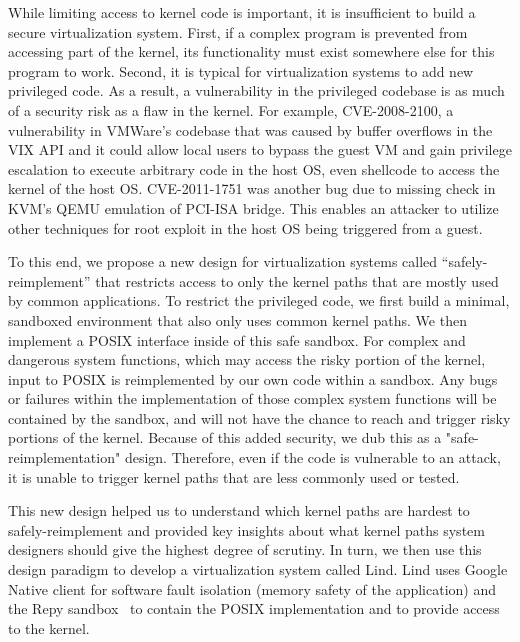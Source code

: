 While limiting access to kernel code is important, it is
insufficient to build a secure virtualization system.  First, if a complex
program is prevented from accessing part of the kernel, its functionality
must exist somewhere else for this program to work.  Second, it is
typical for virtualization systems to add new privileged code.
As a result, a vulnerability in the privileged codebase is as much of a security
risk as a flaw in the kernel.  %
For example, CVE-2008-2100, a vulnerability in VMWare's codebase that was caused by buffer overflows
in the VIX API and it could allow local users to bypass the guest VM and gain privilege escalation to execute arbitrary code
in the host OS, even shellcode to access the kernel of the host OS. CVE-2011-1751 was another bug due to
missing check in KVM's QEMU emulation of PCI-ISA bridge. This enables an attacker to utilize other techniques \cite{Virtunoid}
for root exploit in the host OS being triggered from a guest.


To this end, we propose a new design for virtualization
systems called ``safely-reimplement'' that restricts access to only the
kernel paths that are mostly used by common applications.  To restrict the privileged
code, we first build a minimal, sandboxed environment that also only uses
common kernel paths.
We then implement a POSIX interface inside of this safe sandbox. For complex and dangerous system functions,
which may access the risky portion of the kernel,
input to POSIX is reimplemented by our own code within a sandbox. Any bugs or failures within the implementation of
those complex system functions
will be contained by the sandbox, and will not have the chance to reach
and trigger risky portions of the kernel. Because of this added security, we dub this as a "safe-reimplementation" design.
Therefore, even if the code
is vulnerable to an attack, it is unable to trigger
kernel paths that are less commonly used or tested.

This new design helped us to understand which kernel paths are hardest to
safely-reimplement and provided key insights about what kernel paths system
designers should give the highest degree of scrutiny. In turn, we then use this design paradigm to develop
a virtualization system called
Lind.  Lind uses Google Native client for software fault isolation (memory
safety of the application) and the Repy sandbox~\cite{Repy-10} to contain the POSIX
implementation and to provide access to the kernel.


